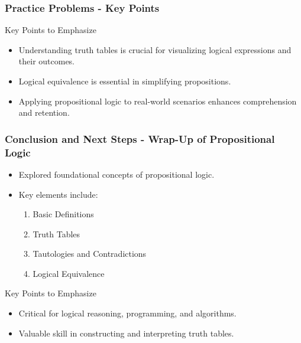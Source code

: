 \documentclass[aspectratio=169]{beamer}
\begin{document}
\begin{frame}[fragile]
    \frametitle{Practice Problems - Key Points}
    \begin{block}{Key Points to Emphasize}
        \begin{itemize}
            \item Understanding truth tables is crucial for visualizing logical expressions and their outcomes.
            \item Logical equivalence is essential in simplifying propositions.
            \item Applying propositional logic to real-world scenarios enhances comprehension and retention.
        \end{itemize}
    \end{block}
\end{frame}

\begin{frame}[fragile]
  \frametitle{Conclusion and Next Steps - Wrap-Up of Propositional Logic}
  
  \begin{itemize}
    \item Explored foundational concepts of propositional logic.
    \item Key elements include:
      \begin{enumerate}
        \item Basic Definitions
        \item Truth Tables
        \item Tautologies and Contradictions
        \item Logical Equivalence
      \end{enumerate}
  \end{itemize}
  
  \begin{block}{Key Points to Emphasize}
    \begin{itemize}
      \item Critical for logical reasoning, programming, and algorithms.
      \item Valuable skill in constructing and interpreting truth tables.
    \end{itemize}
  \end{block}
\end{frame}
\end{document}
